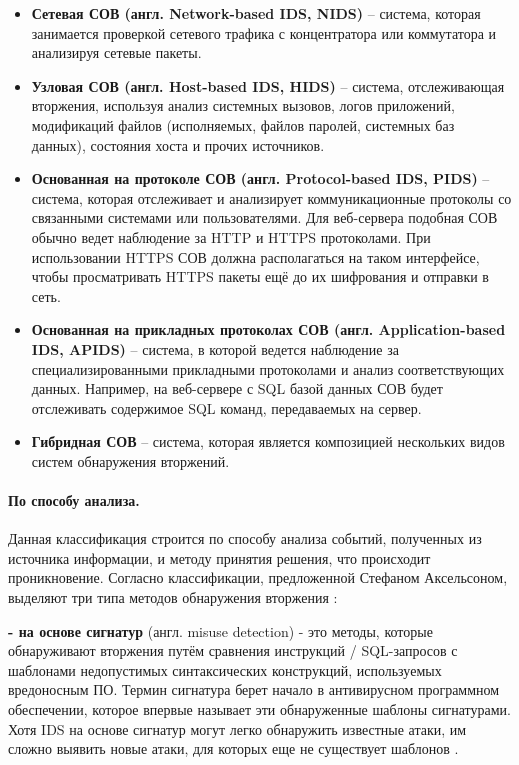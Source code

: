 \begin{itemize}
	\item \textbf{ Сетевая СОВ (англ. Network-based IDS, NIDS)} -- система,
	которая занимается проверкой сетевого трафика с концентратора или коммутатора и
	анализируя сетевые пакеты.

	\item \textbf{Узловая СОВ (англ. Host-based IDS, HIDS)} -- система,
	отслеживающая вторжения, используя анализ системных вызовов, логов приложений,
	модификаций файлов (исполняемых, файлов паролей, системных баз данных), состояния
	хоста и прочих источников.
	
	\item \textbf{Основанная на протоколе СОВ (англ. Protocol-based IDS, PIDS)} -- система, которая отслеживает и анализирует коммуникационные протоколы со связанными системами или пользователями. Для веб-сервера подобная СОВ обычно ведет наблюдение за HTTP и HTTPS протоколами. При использовании HTTPS СОВ должна располагаться на таком интерфейсе, чтобы просматривать HTTPS пакеты ещё до их шифрования и отправки в сеть.

	\item \textbf{Основанная на прикладных протоколах СОВ (англ. Application-based IDS, APIDS)} --
	система, в которой ведется наблюдение за специализированными прикладными протоколами
	и анализ соответствующих данных. Например, на веб-сервере с SQL базой данных СОВ будет
	отслеживать содержимое SQL команд, передаваемых на сервер.

	\item \textbf{Гибридная СОВ} -- система, которая является композицией нескольких видов
	систем обнаружения вторжений.
\end{itemize}


\paragraph*{По способу анализа.}

Данная классификация строится по способу анализа событий, полученных из источника информации, и методу принятия решения, что происходит проникновение. Согласно классификации, предложенной Стефаном Аксельсоном, выделяют три типа методов обнаружения вторжения \cite{IDSClassification}:

\textbf{- на основе сигнатур} (англ. misuse detection) - это методы, которые обнаруживают вторжения путём сравнения инструкций / SQL-запросов с шаблонами недопустимых синтаксических конструкций, используемых вредоносным ПО. Термин сигнатура берет начало в антивирусном программном обеспечении, которое впервые называет эти обнаруженные шаблоны сигнатурами. Хотя IDS на основе сигнатур могут легко обнаружить известные атаки, им сложно выявить новые атаки, для которых еще не существует шаблонов \cite{NetSecChristos}.

